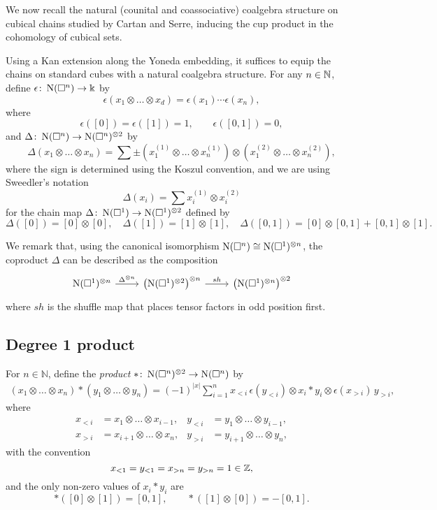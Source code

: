 We now recall the natural (counital and coassociative) coalgebra structure on cubical chains studied by Cartan and Serre, inducing the cup product in the cohomology of cubical sets.

Using a Kan extension along the Yoneda embedding, it suffices to equip the chains on standard cubes with a natural coalgebra structure.
For any $n \in \mathbb{N}$, define $\epsilon \colon \operatorname{N}(\square^n) \to \Bbbk$ by
\[
\epsilon \left( x_1 \otimes \dots \otimes x_d \right) = \epsilon(x_1) \dotsm \epsilon(x_n),
\]
where
\[
\epsilon([0]) = \epsilon([1]) = 1, \qquad \epsilon([0, 1]) = 0,
\]
and $\Delta \colon \operatorname{N}(\square^n) \to \operatorname{N}(\square^n)^{\otimes 2}$ by
\[
\Delta (x_1 \otimes \dots \otimes x_n) =
\sum \pm \left( x_1^{(1)} \otimes \dots \otimes x_n^{(1)} \right) \otimes
\left( x_1^{(2)} \otimes \dots \otimes x_n^{(2)} \right),
\]
where the sign is determined using the Koszul convention, and we are using Sweedler's notation
\[
\Delta(x_i) = \sum x_i^{(1)} \otimes x_i^{(2)}
\]
for the chain map $\Delta \colon \operatorname{N}(\square^1) \to \operatorname{N}(\square^1)^{\otimes 2}$ defined by
\[
\Delta([0]) = [0] \otimes [0], \quad \Delta([1]) = [1] \otimes [1], \quad \Delta([0,1]) = [0] \otimes [0,1] + [0,1] \otimes [1].
\]

We remark that, using the canonical isomorphism $\operatorname{N}(\square^n) \cong \operatorname{N}(\square^1)^{\otimes n}$, the coproduct $\Delta$ can be described as the composition
\[
\begin{tikzcd}
\chains(\cube^1)^{\otimes n} \arrow[r, "\Delta^{\otimes n}"] & \left( \chains(\cube^1)^{\otimes 2} \right)^{\otimes n} \arrow[r, "sh"] & \left( \chains(\cube^1)^{\otimes n} \right)^{\otimes 2}
\end{tikzcd}
\]
where $sh$ is the shuffle map that places tensor factors in odd position first.

\subsection{Degree 1 product}

For $n \in \mathbb{N}$, define the \textit{product} $\ast  \colon \operatorname{N}(\square^n)^{\otimes 2} \to \operatorname{N}(\square^n)$ by
\begin{align*}
(x_1 \otimes \dots \otimes x_n) \ast (y_1 \otimes \dots \otimes y_n) =
(-1)^{|x|} \sum_{i=1}^n x_{<i}\, \epsilon(y_{<i}) \otimes x_i \ast y_i \otimes \epsilon(x_{>i}) \, y_{>i},
\end{align*}
where
\begin{align*}
x_{<i} & = x_1 \otimes \dots \otimes x_{i-1}, &
y_{<i} & = y_1 \otimes \dots \otimes y_{i-1}, \\
x_{>i} & = x_{i+1} \otimes \dots \otimes x_n, &
y_{>i} & = y_{i+1} \otimes \dots \otimes y_n,
\end{align*}
with the convention
\[
x_{<1} = y_{<1} = x_{>n} = y_{>n} = 1 \in \mathbb{Z},
\]
and the only non-zero values of $x_i \ast y_i$ are
\[
\ast([0] \otimes [1]) = [0, 1], \qquad  \ast([1] \otimes [0]) = -[0, 1].
\]

